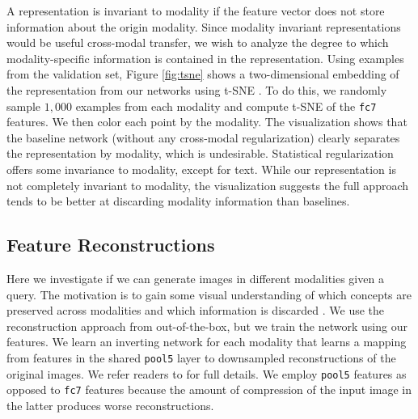 \documentclass[10pt,journal,compsoc]{IEEEtran}
\begin{document}
    A representation is invariant to modality if the feature vector does not store information about the origin modality. Since modality invariant representations would be useful cross-modal transfer, we wish to analyze the degree to which modality-specific information is contained in the representation. Using examples from the validation set, Figure \ref{fig:tsne} shows a two-dimensional embedding of the representation from our networks using t-SNE \cite{maaten2008visualizing}. To do this, we randomly sample $1,000$ examples from each modality and compute t-SNE of the \texttt{fc7} features. We then color each point by the modality. The visualization shows that the baseline network (without any cross-modal regularization) clearly separates the representation by modality, which is undesirable. Statistical regularization offers some invariance to modality, except for text. While our representation is not completely invariant to modality, the visualization suggests the full approach tends to be better at discarding modality information than baselines.
    
	\subsection{Feature Reconstructions}
	Here we investigate if we can generate images in different modalities given a query. The motivation is to gain some visual understanding of which concepts are preserved across modalities and which information is discarded \cite{vondrick2013hoggles}. We use the reconstruction approach from \cite{dosovitskiy2015inverting} out-of-the-box, but we train the network using our features. We learn an inverting network for each modality that learns a mapping from features in the shared \texttt{pool5} layer to downsampled reconstructions of the original images. We refer readers to \cite{dosovitskiy2015inverting} for full details. We employ \texttt{pool5} features as opposed to \texttt{fc7} features because the amount of compression of the input image in the latter produces worse reconstructions.
		
		

	
\end{document}
